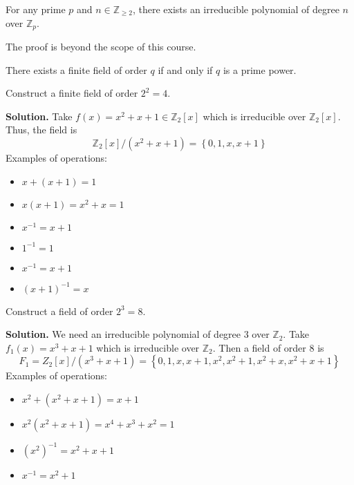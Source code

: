 \begin{thmbox}
    \begin{theorem}
        For any prime $ p $ and $ n\in\mathbb{Z}_{\geqslant 2} $, there exists
        an irreducible polynomial of degree $ n $ over $ \mathbb{Z}_p $.
    \end{theorem}
\end{thmbox}
The proof is beyond the scope of this course.

\begin{thmbox}
    \begin{theorem}
        There exists a finite field of order $ q $ if and only if
        $ q $ is a prime power.
    \end{theorem}
\end{thmbox}

\begin{exbox}
    \begin{example}
        Construct a finite field of order $ 2^2=4 $.

        \textbf{Solution.} Take $ f(x)=x^2+x+1\in\mathbb{Z}_2[x] $
        which is irreducible over $ \mathbb{Z}_2[x] $. Thus, the field is
        \[ \mathbb{Z}_2[x]/(x^2+x+1)=\left\{ 0,1,x,x+1\right\} \]
        Examples of operations:
        \begin{itemize}
            \item $ x+(x+1)=1 $
            \item $ x(x+1)=x^2+x=1 $
            \item $ x^{-1}=x+1 $
            \item $ 1^{-1}=1 $
            \item $ x^{-1}=x+1 $
            \item $ (x+1)^{-1}=x $
        \end{itemize}
    \end{example}
\end{exbox}

\begin{exbox}
    \begin{example}
        Construct a field of order $ 2^3=8 $.

        \textbf{Solution.} We need an irreducible polynomial of degree $ 3 $
        over $ \mathbb{Z}_2 $. Take $ f_1(x)=x^3+x+1 $ which is
        irreducible over $ \mathbb{Z}_2 $. Then a field of order $ 8 $ is
        \[ F_1=Z_2[x]/(x^3+x+1)=\left\{ 0,1,x,x+1,x^2,x^2+1,x^2+x,x^2+x+1\right\} \]
        Examples of operations:
        \begin{itemize}
            \item $ x^2+(x^2+x+1)=x+1 $
            \item $ x^2(x^2+x+1)=x^4+x^3+x^2=1 $
            \item $ (x^2)^{-1}=x^2+x+1 $
            \item $ x^{-1}=x^2+1 $
        \end{itemize}
    \end{example}
\end{exbox}

